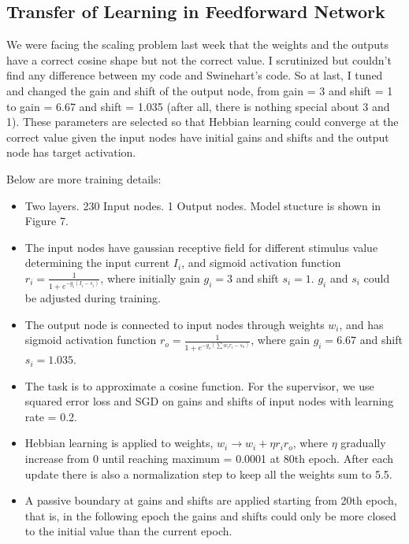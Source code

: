 \documentclass[12pt, a4paper]{article}
\begin{document}
\newpage

\subsection*{Transfer of Learning in Feedforward Network}

We were facing the scaling problem last week that the weights and the outputs have a correct cosine shape but not the correct value. I scrutinized but couldn't find any difference between my code and Swinehart's code. So at last, I tuned and changed the gain and shift of the output node, from gain = 3 and shift = 1 to gain = 6.67 and shift = 1.035 (after all, there is nothing special about 3 and 1). These parameters are selected so that Hebbian learning could converge at the correct value given the input nodes have initial gains and shifts and the output node has target activation.

Below are more training details:
\begin{itemize}
    \item Two layers. 230 Input nodes. 1 Output nodes. Model stucture is shown in Figure 7.
    \item The input nodes have gaussian receptive field for different stimulus value determining the input current $I_i$, and sigmoid activation function $r_i = \frac{1}{1 + e^{-g_i(I_i-s_i)}}$, where initially gain $g_i = 3$ and shift $s_i = 1$. $g_i$ and $s_i$ could be adjusted during training.
    \item The output node is connected to input nodes through weights $w_i$, and has sigmoid activation function $r_o = \frac{1}{1 + e^{-g_o(\sum w_ir_i - s_o)}}$, where gain $g_i = 6.67$ and shift $s_i = 1.035$.
    \item The task is to approximate a cosine function. For the supervisor, we use squared error loss and SGD on gains and shifts of input nodes with learning rate = 0.2.
    \item Hebbian learning is applied to weights, $w_i \rightarrow w_i + \eta r_i r_o$, where $\eta$ gradually increase from 0 until reaching maximum = 0.0001 at 80th epoch. After each update there is also a normalization step to keep all the weights sum to 5.5.
    \item A passive boundary at gains and shifts are applied starting from 20th epoch, that is, in the following epoch the gains and shifts could only be more closed to the initial value than the current epoch.
\end{itemize}
\end{document}
